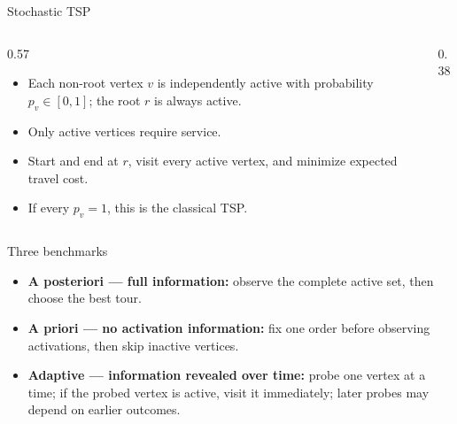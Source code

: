 \documentclass[aspectratio=169,12pt]{beamer}
\begin{document}
\begin{frame}{Stochastic TSP}
  \begin{columns}[c,onlytextwidth]
    \begin{column}{0.57\textwidth}
      \begin{itemize}
        \setlength{\itemsep}{0.46em}
        \item Each non-root vertex \(v\) is independently active with
          probability \(p_v\in[0,1]\); the root \(r\) is always active.
        \item Only active vertices require service.
        \item Start and end at \(r\), visit every active vertex, and minimize
          expected travel cost.
        \item If every \(p_v=1\), this is the classical TSP.
      \end{itemize}
    \end{column}
    \begin{column}{0.38\textwidth}
      \centering
      \resizebox{0.96\linewidth}{!}{\ThStochasticGraph}
    \end{column}
  \end{columns}
\end{frame}

\begin{frame}{Three benchmarks}
  \begin{itemize}
    \setlength{\itemsep}{0.52em}
    \item \textbf{A posteriori --- full information:} observe the complete
      active set, then choose the best tour.
    \item \textbf{A priori --- no activation information:} fix one order
      before observing activations, then skip inactive vertices.
    \item \textbf{Adaptive --- information revealed over time:} probe one
      vertex at a time; if the probed vertex is active, visit it immediately;
      later probes may depend on earlier outcomes.
  \end{itemize}
\end{frame}
\end{document}
